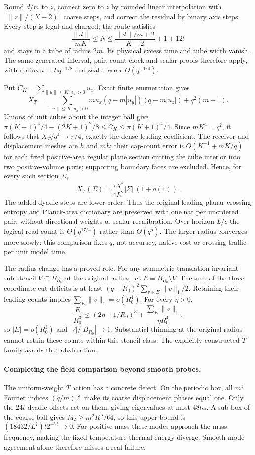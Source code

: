 Round $d/m$ to $z$, connect zero to $z$ by rounded linear interpolation
with $\lceil\|z\|/(K-2)\rceil$ coarse steps, and correct the residual by
binary axis steps. Every step is legal and charged; the route satisfies
\[
 \frac{\|d\|}{mK}\le N\le
 \frac{\|d\|/m+2}{K-2}+1+12t
\]
and stays in a tube of radius $2m$. Its physical excess time and tube width
vanish. The same generated-interval, pair, count-clock and scalar proofs
therefore apply, with radius $a=Lq^{-1/8}$ and scalar error $O(q^{-1/4})$.

Put $C_K=\sum_{\|u\|\le K,\,u_x>0}u_x$. Exact finite enumeration gives
\[
 X_T=\sum_{\|u\|\le K,\,u_x>0}
       mu_x(q-m|u_y|)(q-m|u_z|)+q^2(m-1).
\]
Unions of unit cubes about the integer ball give
$\pi(K-1)^4/4-(2K+1)^2/8\le C_K\le\pi(K+1)^4/4$.
Since $mK^4=q^2$, it follows that $X_T/q^4\to\pi/4$, exactly the dense
leading coefficient. The receiver and displacement meshes are $h$ and $mh$;
their cap-count error is $O(K^{-1}+mK/q)$ for each fixed positive-area regular
plane section cutting the cube interior into two positive-volume parts;
supporting boundary faces are excluded. Hence, for every such section $\Sigma$,
\[
 X_T(\Sigma)=\frac{\pi q^4}{4L^2}|\Sigma|\,(1+o(1)).
\]
The added dyadic steps are lower order. Thus the original leading planar
crossing entropy and Planck-area dictionary are preserved with one nat per
unordered pair, without directional weights or scalar recalibration.
Over horizon $L/c$ the logical read count is $\Theta(q^{17/4})$ rather than
$\Theta(q^5)$. The larger radius converges more slowly: this comparison fixes
$q$, not accuracy, native cost or crossing traffic per unit model time.

The radius change has a proved role. For any symmetric translation-invariant
sub-stencil $V\subseteq B_{R_0}$ at the original radius, let $E=B_{R_0}\setminus V$.
The sum of the three coordinate-cut deficits is at least
$(q-R_0)^2\sum_{v\in E}\|v\|_1/2$. Retaining their leading counts implies
$\sum_E\|v\|_1=o(R_0^4)$. For every $\eta>0$,
\[
 \frac{|E|}{R_0^3}\le (2\eta+1/R_0)^3+
       \frac{\sum_E\|v\|_1}{\eta R_0^4},
\]
so $|E|=o(R_0^3)$ and $|V|/|B_{R_0}|\to1$. Substantial thinning at the
original radius cannot retain these counts within this stencil class.
The explicitly constructed $T$ family avoids that obstruction.

\paragraph{Completing the field comparison beyond smooth probes.}
The uniform-weight $T$ action has a concrete defect. On the periodic box,
all $m^3$ Fourier indices $(q/m)\ell$ make its coarse displacement phases
equal one. Only the $24t$ dyadic offsets act on them, giving eigenvalues at
most $48t\alpha$. A sub-box of the coarse ball gives
$M_2\ge m^2K^5/64$, so this upper bound is
$(18432/L^2)t2^{-7t}\to0$. For positive mass these modes approach the mass
frequency, making the fixed-temperature thermal energy diverge. Smooth-mode
agreement alone therefore misses a real failure.

